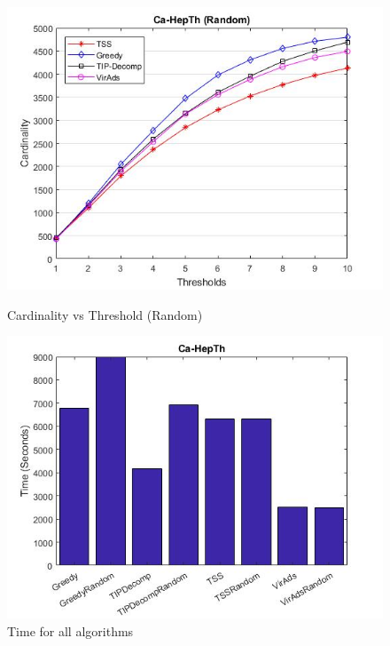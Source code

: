 \begin{figure}[h!]
\begin{minipage}[t]{0.50\textwidth}
\includegraphics[width=\linewidth,keepaspectratio=true]{images/ca-hepthresultrandom.jpg}
\caption{Cardinality vs Threshold (Random)}

\end{minipage}
\begin{minipage}[t]{0.50\textwidth}
\includegraphics[width=\linewidth,keepaspectratio=true]{images/hepthtime.jpg}
\caption{Time for all algorithms}
\end{minipage}
\end{figure}

